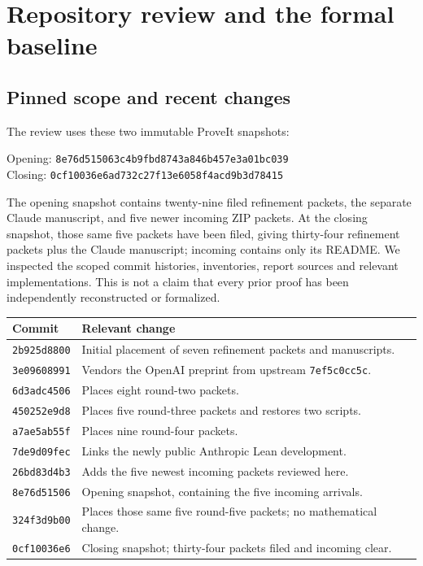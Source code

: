 \section{Repository review and the formal baseline}\label{sec:review}

\subsection{Pinned scope and recent changes}

The review uses these two immutable ProveIt snapshots:
\begin{flushleft}\small
Opening: \texttt{8e76d515063c4b9fbd8743a846b457e3a01bc039}\\
Closing: \texttt{0cf10036e6ad732c27f13e6058f4acd9b3d78415}
\end{flushleft}
The opening snapshot contains twenty-nine filed refinement packets, the
separate Claude manuscript, and five newer incoming ZIP packets. At the
closing snapshot, those same five packets have been filed, giving
thirty-four refinement packets plus the Claude manuscript; incoming
contains only its README.
We inspected the scoped commit histories, inventories, report sources and
relevant implementations. This is not a claim that every prior proof has
been independently reconstructed or formalized.

\begin{center}\small
\begin{tabular}{@{}p{}p{}@{}}
\toprule Commit & Relevant change\\\midrule
\texttt{2b925d8800} & Initial placement of seven refinement packets and manuscripts.\\
\texttt{3e09608991} & Vendors the OpenAI preprint from upstream \texttt{7ef5c0cc5c}.\\
\texttt{6d3adc4506} & Places eight round-two packets.\\
\texttt{450252e9d8} & Places five round-three packets and restores two scripts.\\
\texttt{a7ae5ab55f} & Places nine round-four packets.\\
\texttt{7de9d09fec} & Links the newly public Anthropic Lean development.\\
\texttt{26bd83d4b3} & Adds the five newest incoming packets reviewed here.\\
\texttt{8e76d51506} & Opening snapshot, containing the five incoming arrivals.\\
\texttt{324f3d9b00} & Places those same five round-five packets; no mathematical change.\\
\texttt{0cf10036e6} & Closing snapshot; thirty-four packets filed and incoming clear.\\
\bottomrule
\end{tabular}
\end{center}

